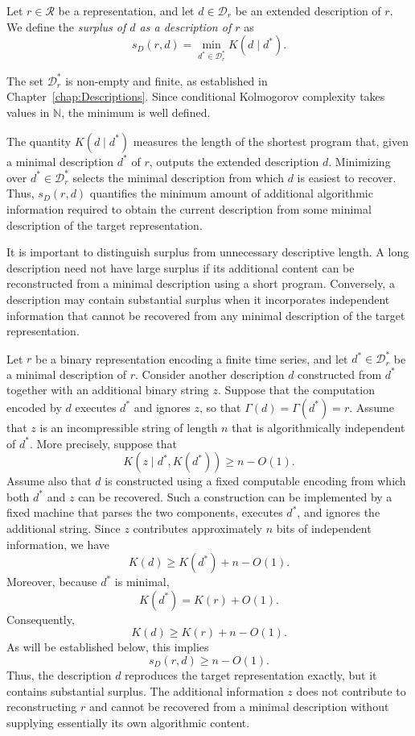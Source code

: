 \begin{definition}
\label{def:surplus_description}
Let $r\in\mathcal R$ be a representation, and let $d\in\mathcal D_r$ be an extended description of $r$. We define the \emph{surplus of $d$ as a description of $r$} as
\[
s_D(r,d) = \min_{d^\ast\in\mathcal D_r^\ast}K(d\mid d^\ast).
\]
\end{definition}

The set $\mathcal D_r^\ast$ is non-empty and finite, as established in Chapter~\ref{chap:Descriptions}. Since conditional Kolmogorov complexity takes values in $\mathbb N$, the minimum is well defined.

The quantity $K(d\mid d^\ast)$ measures the length of the shortest program that, given a minimal description $d^\ast$ of $r$, outputs the extended description $d$. Minimizing over $d^\ast\in\mathcal D_r^\ast$ selects the minimal description from which $d$ is easiest to recover. Thus, $s_D(r,d)$ quantifies the minimum amount of additional algorithmic information required to obtain the current description from some minimal description of the target representation.

It is important to distinguish surplus from unnecessary descriptive length. A long description need not have large surplus if its additional content can be reconstructed from a minimal description using a short program. Conversely, a description may contain substantial surplus when it incorporates independent information that cannot be recovered from any minimal description of the target representation.

\begin{example}
\label{ex:surplus_description}
Let $r$ be a binary representation encoding a finite time series, and let $d^\ast\in\mathcal D_r^\ast$ be a minimal description of $r$. Consider another description $d$ constructed from $d^\ast$ together with an additional binary string $z$. Suppose that the computation encoded by $d$ executes $d^\ast$ and ignores $z$, so that $\Gamma(d) = \Gamma(d^\ast) = r$. Assume that $z$ is an incompressible string of length $n$ that is algorithmically independent of $d^\ast$. More precisely, suppose that
\[
K(z\mid d^\ast,K(d^\ast))\ge n-O(1).
\]
Assume also that $d$ is constructed using a fixed computable encoding from which both $d^\ast$ and $z$ can be recovered. Such a construction can be implemented by a fixed machine that parses the two components, executes $d^\ast$, and ignores the additional string. Since $z$ contributes approximately $n$ bits of independent information, we have
\[
K(d)\ge K(d^\ast)+n-O(1).
\]
Moreover, because $d^\ast$ is minimal,
\[
K(d^\ast)=K(r)+O(1).
\]
Consequently,
\[
K(d)\ge K(r)+n-O(1).
\]
As will be established below, this implies
\[
s_D(r,d)\ge n-O(1).
\]
Thus, the description $d$ reproduces the target representation exactly, but it contains substantial surplus. The additional information $z$ does not contribute to reconstructing $r$ and cannot be recovered from a minimal description without supplying essentially its own algorithmic content.
\end{example}

